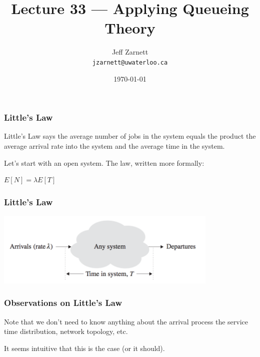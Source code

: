 

\title{Lecture 33 --- Applying Queueing Theory}

\author{Jeff Zarnett\\ \small \texttt{jzarnett@uwaterloo.ca}}
\date{\today}




\begin{frame}
  \titlepage

 \end{frame}




\begin{frame}
\frametitle{Little's Law}

Little's Law says the average number of jobs in the system equals the product the average arrival rate into the system and the average time in the system. 

Let's start with an open system. The law, written more formally:

\begin{center}
	$E[N] = \lambda E[T]$
\end{center}

\end{frame}



\begin{frame}
\frametitle{Little's Law}

\begin{center}
	\includegraphics[width=0.8\textwidth]{images/littleslaw.png}
\end{center}

\end{frame}



\begin{frame}
\frametitle{Observations on Little's Law}

Note that we don't need to know anything about the arrival process the service time distribution, network topology, etc. 

It seems intuitive that this is the case (or it should). 

\end{frame}



